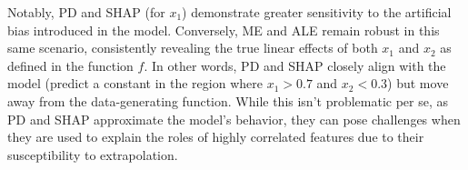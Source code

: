 Notably, PD and SHAP (for \(x_1\)) demonstrate greater sensitivity to the artificial bias introduced in the model. Conversely, ME and ALE remain robust in this same scenario, consistently revealing the true linear effects of both $x_1$ and $x_2$ as defined in the function \(f\).  In other words, PD and SHAP closely align with the model (predict a constant in the region where $x_1 > 0.7$ and $x_2 <0.3 $) but move away from the data-generating function. While this isn't problematic per se, as PD and SHAP approximate the model's behavior, they can pose challenges when they are used to explain the roles of highly correlated features due to their susceptibility to extrapolation.






